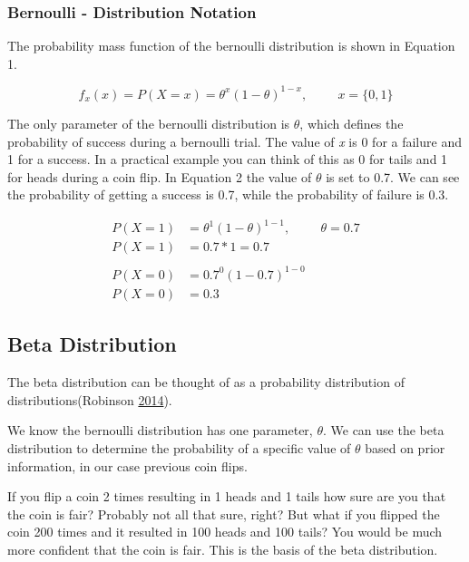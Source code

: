 \documentclass[]{book}
\theoremstyle{definition}
\theoremstyle{definition}
\theoremstyle{definition}
\theoremstyle{remark}
\begin{document}
\subsubsection{Bernoulli - Distribution
Notation}\label{bernoulli---distribution-notation}

The probability mass function of the bernoulli distribution is shown in
Equation 1.

\[
f_{x}(x)=P(X=x)=\theta^{x}(1-\theta)^{1-x}, \hspace{1cm} x = \{0,1\} 
\tag{1}
\]

The only parameter of the bernoulli distribution is \(\theta\), which
defines the probability of success during a bernoulli trial. The value
of \emph{x} is 0 for a failure and 1 for a success. In a practical
example you can think of this as 0 for tails and 1 for heads during a
coin flip. In Equation 2 the value of \(\theta\) is set to 0.7. We can
see the probability of getting a success is 0.7, while the probability
of failure is 0.3.

\[
\begin{aligned}
P(X=1)&=\theta^{1}(1-\theta)^{1-1}, \hspace{1cm} \theta=0.7 \\
P(X=1)&=0.7*1=0.7 \\\\
P(X=0)&=0.7^{0}(1-0.7)^{1-0}\\
P(X=0)&=0.3
\end{aligned}
\tag{2}
\]

\subsection{Beta Distribution}\label{beta-distribution}

The beta distribution can be thought of as a probability distribution of
distributions(Robinson \protect\hyperlink{ref-Robinson2014beta}{2014}).

We know the bernoulli distribution has one parameter, \(\theta\). We can
use the beta distribution to determine the probability of a specific
value of \(\theta\) based on prior information, in our case previous
coin flips.

If you flip a coin 2 times resulting in 1 heads and 1 tails how sure are
you that the coin is fair? Probably not all that sure, right? But what
if you flipped the coin 200 times and it resulted in 100 heads and 100
tails? You would be much more confident that the coin is fair. This is
the basis of the beta distribution.
\end{document}
